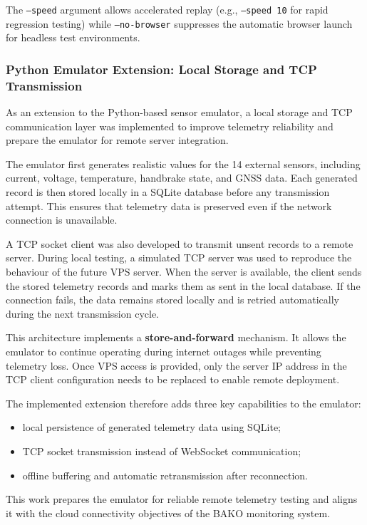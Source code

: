 The \texttt{--speed} argument allows accelerated replay (e.g., \texttt{--speed 10} for rapid regression testing) while \texttt{--no-browser} suppresses the automatic browser launch for headless test environments.

\subsubsection{Python Emulator Extension: Local Storage and TCP Transmission}

As an extension to the Python-based sensor emulator, a local storage and TCP communication layer was implemented to improve telemetry reliability and prepare the emulator for remote server integration.

The emulator first generates realistic values for the 14 external sensors, including current, voltage, temperature, handbrake state, and GNSS data. Each generated record is then stored locally in a SQLite database before any transmission attempt. This ensures that telemetry data is preserved even if the network connection is unavailable.

A TCP socket client was also developed to transmit unsent records to a remote server. During local testing, a simulated TCP server was used to reproduce the behaviour of the future VPS server. When the server is available, the client sends the stored telemetry records and marks them as sent in the local database. If the connection fails, the data remains stored locally and is retried automatically during the next transmission cycle.

This architecture implements a \textbf{store-and-forward} mechanism. It allows the emulator to continue operating during internet outages while preventing telemetry loss. Once VPS access is provided, only the server IP address in the TCP client configuration needs to be replaced to enable remote deployment.

The implemented extension therefore adds three key capabilities to the emulator:
\begin{itemize}
    \item local persistence of generated telemetry data using SQLite;
    \item TCP socket transmission instead of WebSocket communication;
    \item offline buffering and automatic retransmission after reconnection.
\end{itemize}

This work prepares the emulator for reliable remote telemetry testing and aligns it with the cloud connectivity objectives of the BAKO monitoring system.

